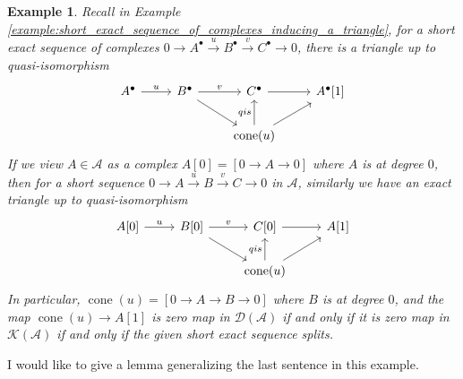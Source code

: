 \documentclass{ctexart}
\newtheorem{example}{Example}[section]
\newcommand{\cone}{\operatorname{cone}}
\begin{document}
\begin{example}
    Recall in Example \ref{example:short_exact_sequence_of_complexes_inducing_a_triangle}, 
    for a short exact sequence of complexes $0 \rightarrow A^{\bullet} \overset{u}{\rightarrow} B^{\bullet} \overset{v}{\rightarrow} C^{\bullet} \rightarrow 0$,
    there is a triangle up to quasi-isomorphism
    \begin{equation}
        \begin{tikzcd}
            A^{\bullet} \arrow[r, "u"] &
            B^{\bullet} \arrow[r, "v"] \arrow[dr] &
            C^{\bullet} \arrow[r] &
            A^{\bullet}[1] \\
            && \cone(u) \arrow[u, "qis"] \arrow[ur] &
        \end{tikzcd}
    \end{equation}
    If we view $A\in \mathscr{A}$ as a complex $A[0] = [0 \rightarrow A \rightarrow 0]$ where $A$ is at degree $0$,
    then for a short sequence $0 \rightarrow A \overset{u}{\rightarrow} B \overset{v}{\rightarrow} C \rightarrow 0$ in $\mathscr{A}$,
    similarly we have an exact triangle up to quasi-isomorphism
    \begin{equation}
        \begin{tikzcd}
            A[0] \arrow[r, "u"] &
            B[0] \arrow[r, "v"] \arrow[dr] &
            C[0] \arrow[r] &
            A[1] \\
            && \cone(u) \arrow[u, "qis"] \arrow[ur] &
        \end{tikzcd}
    \end{equation}
    In particular, $\cone(u) = [0 \rightarrow A \rightarrow B \rightarrow 0]$ where $B$ is at degree $0$,
    and the map $\cone(u) \rightarrow A[1]$ is zero map in $\mathcal{D}(\mathscr{A})$ if and only if it is zero map in $\mathcal{K}(\mathscr{A})$ if and only if the given short exact sequence splits.
\end{example}
I would like to give a lemma generalizing the last sentence in this example.
\end{document}
